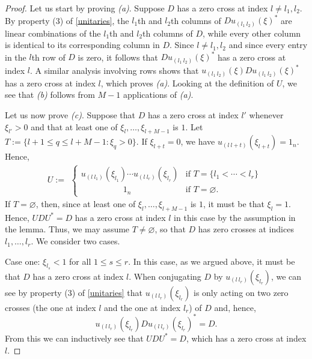 \documentclass[12pt]{amsart}
\numberwithin{equation}{section}
\theoremstyle{definition}
\theoremstyle{remark}
\begin{document}
\begin{proof}
	Let us start by proving \textit{(a)}. Suppose $D$ has a zero cross at index $l\not=l_{1},l_{2}$. By property (3) of \autoref{unitaries}, the $l_{1}$th and $l_{2}$th columns of $Du_{(l_{1} \ l_{2})}(\xi)^{*}$ are linear combinations of the $l_{1}$th and $l_{2}$th columns of $D$, while every other column is identical to its corresponding column in $D$. Since $l\not=l_{1},l_{2}$ and since every entry in the $l$th row of $D$ is zero, it follows that $Du_{(l_{1} \ l_{2})}(\xi)^{*}$ has a zero cross at index $l$. A similar analysis involving rows shows that $u_{(l_{1} \ l_{2})}(\xi)Du_{(l_{1} \ l_{2})}(\xi)^{*}$ has a zero cross at index $l$, which proves \textit{(a)}. Looking at the definition of $U$, we see that \textit{(b)} follows from $M-1$ applications of \textit{(a)}. 
	
	Let us now prove \textit{(c)}. Suppose that $D$ has a zero cross at index $l'$ whenever $\xi_{l'}>0$ and that at least one of $\xi_{l},\ldots,\xi_{l+M-1}$ is $1$. Let $T:=\{l+1\leq q\leq l+M-1:\xi_{q}>0\}$. If $\xi_{l+t}=0$, we have $u_{(l \ l+t)}(\xi_{l+t})=1_{n}$. Hence, 
	$$
	U:=
	\begin{aligned}
	\begin{cases}
	u_{(l \ l_{1})}(\xi_{l_{1}})\cdots u_{(l \ l_{r})}(\xi_{l_{r}}) & \text{if }T=\{l_{1}<\cdots<l_{r}\}\\
	\qquad\qquad\quad1_{n} & \text{if }T=\varnothing.
	\end{cases}
	\end{aligned}
	$$
	If $T=\varnothing$, then, since at least one of $\xi_{l},\ldots,\xi_{l+M-1}$ is $1$, it must be that $\xi_{l}=1$. Hence, $UDU^{*}=D$ has a zero cross at index $l$ in this case by the assumption in the lemma. Thus, we may assume $T\not=\varnothing$, so that $D$ has zero crosses at indices $l_{1},\ldots,l_{r}$. We consider two cases.
	
	Case one: $\xi_{l_{s}}<1$ for all $1\leq s\leq r$. In this case, as we argued above, it must be that $D$ has a zero cross at index $l$. When conjugating $D$ by $u_{(l \ l_{r})}(\xi_{l_{r}})$, we can see by property (3) of \autoref{unitaries} that $u_{(l \ l_{r})}(\xi_{l_{r}})$ is only acting on two zero crosses (the one at index $l$ and the one at index $l_{r}$) of $D$ and, hence, 
	$$
	u_{(l \ l_{r})}(\xi_{l_{r}})Du_{(l \ l_{r})}(\xi_{l_{r}})^{*}=D.
	$$
	From this we can inductively see that $UDU^{*}=D$, which has a zero cross at index $l$. 
	

\end{proof}
\end{document}
